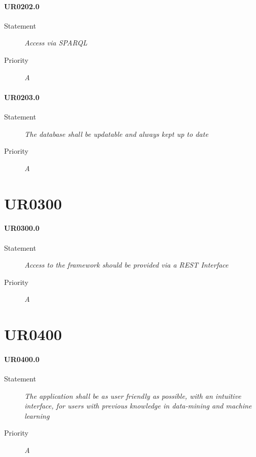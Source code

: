 \paragraph{UR0202.0}
\begin{description}
\item [Statement] \textit{
Access via \gls{SPARQL}
}
\item [Priority] \textit{A}
\end{description}

\paragraph{UR0203.0}
\begin{description}
\item [Statement] \textit{
The database shall be updatable and always kept up to date
}
\item [Priority] \textit{A}
\end{description}

\section{UR0300}

\paragraph{UR0300.0}
\begin{description}
\item [Statement] \textit{
Access to the framework should be provided via a \gls{REST} Interface
}
\item [Priority] \textit{A}
\end{description}

\section{UR0400}

\paragraph{UR0400.0}
\begin{description}
\item [Statement] \textit{
The application shall be as user friendly as possible, with an intuitive interface, for users with previous knowledge in data-mining and machine learning
}
\item [Priority] \textit{A}
\end{description}

